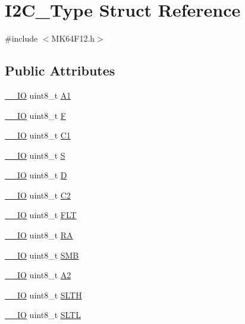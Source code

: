 \hypertarget{structI2C__Type}{}\section{I2\+C\+\_\+\+Type Struct Reference}
\label{structI2C__Type}


{\ttfamily \#include $<$M\+K64\+F12.\+h$>$}

\subsection*{Public Attributes}
\begin{DoxyCompactItemize}
\item 
\hyperlink{core__sc300_8h_aec43007d9998a0a0e01faede4133d6be}{\+\_\+\+\_\+\+IO} uint8\+\_\+t \hyperlink{structI2C__Type_a5f4adcc09ad475b811d37f1462e82c74}{A1}
\item 
\hyperlink{core__sc300_8h_aec43007d9998a0a0e01faede4133d6be}{\+\_\+\+\_\+\+IO} uint8\+\_\+t \hyperlink{structI2C__Type_a4b1063d3e6b714b02cbcbf2e51a51f20}{F}
\item 
\hyperlink{core__sc300_8h_aec43007d9998a0a0e01faede4133d6be}{\+\_\+\+\_\+\+IO} uint8\+\_\+t \hyperlink{structI2C__Type_a8dc1b42eab0063baa1ddb76888a51bd3}{C1}
\item 
\hyperlink{core__sc300_8h_aec43007d9998a0a0e01faede4133d6be}{\+\_\+\+\_\+\+IO} uint8\+\_\+t \hyperlink{structI2C__Type_a162318256d0b1b10410f02ffee1faeb3}{S}
\item 
\hyperlink{core__sc300_8h_aec43007d9998a0a0e01faede4133d6be}{\+\_\+\+\_\+\+IO} uint8\+\_\+t \hyperlink{structI2C__Type_a545035e76e1c914229d2a60cce227fa0}{D}
\item 
\hyperlink{core__sc300_8h_aec43007d9998a0a0e01faede4133d6be}{\+\_\+\+\_\+\+IO} uint8\+\_\+t \hyperlink{structI2C__Type_a1cc523ad84714ff9fe3f28a9b2edccf7}{C2}
\item 
\hyperlink{core__sc300_8h_aec43007d9998a0a0e01faede4133d6be}{\+\_\+\+\_\+\+IO} uint8\+\_\+t \hyperlink{structI2C__Type_ad1329971804f2071ee4684b0513b7cfc}{F\+LT}
\item 
\hyperlink{core__sc300_8h_aec43007d9998a0a0e01faede4133d6be}{\+\_\+\+\_\+\+IO} uint8\+\_\+t \hyperlink{structI2C__Type_a6e1b24826eb462af336d49e3a1b9f8db}{RA}
\item 
\hyperlink{core__sc300_8h_aec43007d9998a0a0e01faede4133d6be}{\+\_\+\+\_\+\+IO} uint8\+\_\+t \hyperlink{structI2C__Type_a148222c48ca2815cfe85c68a6cff61a7}{S\+MB}
\item 
\hyperlink{core__sc300_8h_aec43007d9998a0a0e01faede4133d6be}{\+\_\+\+\_\+\+IO} uint8\+\_\+t \hyperlink{structI2C__Type_a25bd966a745df11edd849836e17a2457}{A2}
\item 
\hyperlink{core__sc300_8h_aec43007d9998a0a0e01faede4133d6be}{\+\_\+\+\_\+\+IO} uint8\+\_\+t \hyperlink{structI2C__Type_a4296f35ffa40f96e2695a8ab22177be6}{S\+L\+TH}
\item 
\hyperlink{core__sc300_8h_aec43007d9998a0a0e01faede4133d6be}{\+\_\+\+\_\+\+IO} uint8\+\_\+t \hyperlink{structI2C__Type_a7e601051f907649a091973dd0ab2ea27}{S\+L\+TL}
\end{DoxyCompactItemize}


